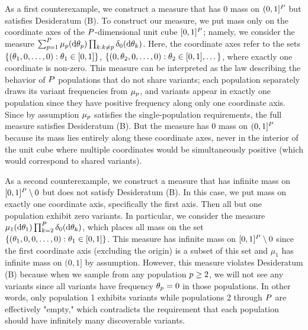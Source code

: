 \begin{myRemark}[On Desideratum (B)]
	As a first counterexample, we construct a measure that has 0 mass on $(0,1]^P$ but satisfies Desideratum (B). 
	To construct our measure, we put mass only on the coordinate axes of the $P$-dimensional unit cube $[0,1]^P$; 
	namely, we consider the measure $\sum_{p=1}^P\mu_{p}(\mathrm{d}\theta_{p})\prod_{k: k\ne p}\delta_{0}(\mathrm{d}\theta_{k})$. 
	Here, the coordinate axes refer to the sets $\{(\theta_{1}, 0, \ldots, 0) : \theta_{1} \in [0,1]\}$, $\{(0, \theta_{2}, 0, \ldots, 0) : \theta_{2} \in [0,1], \dots \}$, where exactly one coordinate is non-zero. 
	This measure can be interpreted as the law describing the behavior of $P$ populations that do not share variants; each population separately draws its variant frequencies from $\mu_{p}$, and variants appear in exactly one population since they have positive frequency along only one coordinate axis. 
	Since by assumption $\mu_{p}$ satisfies the single-population requirements, the full measure satisfies Desideratum (B). 
	But the measure has 0 mass on $(0,1]^P$ because its mass lies entirely along these coordinate axes, never in the interior of the unit cube where multiple coordinates would be simultaneously positive (which would correspond to shared variants).

	As a second counterexample, we construct a measure that has infinite mass on $[0,1]^\numpops\setminus{\bm{0}}$ but does not satisfy Desideratum (B). 
	In this case, we put mass on exactly one coordinate axis, specifically the first axis. 
	Then all but one population exhibit zero variants. 
	In particular, we consider the measure $\mu_{1}(\mathrm{d}\theta_{1})\prod_{k=2}^P\delta_0(\mathrm{d}\theta_{k})$, which places all mass on the set $\{(\theta_{1}, 0, 0, \ldots, 0) : \theta_{1} \in [0,1]\}$. 
	This measure has infinite mass on $[0,1]^\numpops\setminus{\bm{0}}$ since the first coordinate axis (excluding the origin) is a subset of this set and $\mu_1$ has infinite mass on $(0,1]$ by assumption. 
	However, this measure violates Desideratum (B) because when we sample from any population $p \geq 2$, we will not see any variants since all variants have frequency $\theta_{p} = 0$ in those populations. 
	In other words, only population 1 exhibits variants while populations 2 through $P$ are effectively "empty," which contradicts the requirement that each population should have infinitely many discoverable variants.


\end{myRemark}


